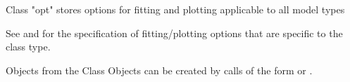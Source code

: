 \begin{Description}\relax
Class "opt" stores options for fitting and plotting applicable to
all model types
\end{Description}
\begin{Details}\relax
See  and   for 
the specification of fitting/plotting options that are specific to the 
class type.
\end{Details}
\begin{Section}{Objects from the Class}
Objects can be created by calls of the form  or
.
\end{Section}
